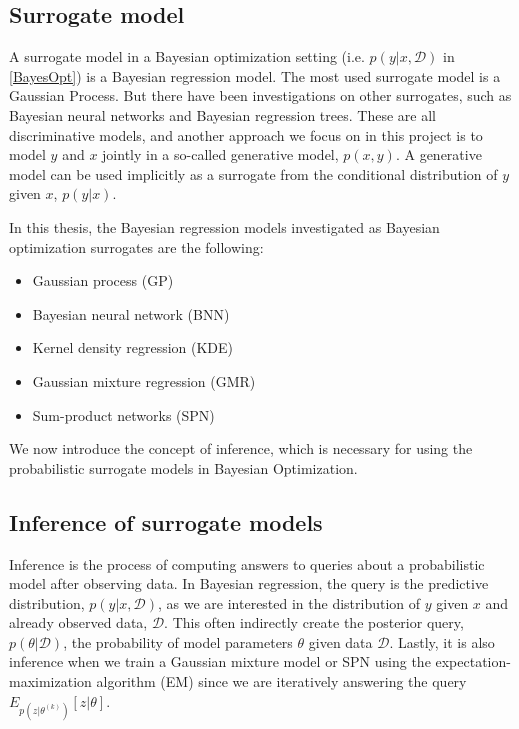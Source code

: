 \subsection{Surrogate model}
A surrogate model in a Bayesian optimization setting (i.e. $p(y|x,\mathcal{D})$ in \eqref{BayesOpt})
is a Bayesian regression model. The most used surrogate model is a Gaussian Process. But there have
been investigations on other surrogates, such as Bayesian neural networks and Bayesian regression
trees. These are all discriminative models, and another approach we focus on in this project is to
model $y$ and $x$ jointly in a so-called generative model, $p(x,y)$. A generative model can be used
implicitly as a surrogate from the conditional distribution of $y$ given $x$, $p(y|x)$.

In this thesis, the Bayesian regression models investigated as Bayesian optimization surrogates are
the following:
\begin{itemize}[noitemsep]
    \item Gaussian process (GP)
    \item Bayesian neural network (BNN)
    \item Kernel density regression (KDE)
    \item Gaussian mixture regression (GMR)
    \item Sum-product networks (SPN)
\end{itemize}

We now introduce the concept of inference, which is necessary for using the probabilistic surrogate models
in Bayesian Optimization. 

\subsection{Inference of surrogate models}
Inference is the process of computing answers to queries about a probabilistic model after observing
data. In Bayesian regression, the query is the predictive distribution, $p(y|x,\mathcal{D})$, as we
are interested in the distribution of $y$ given $x$ and already observed data, $\mathcal{D}$. This
often indirectly create the posterior query, $p(\theta|\mathcal{D})$, the probability of model
parameters $\theta$ given data $\mathcal{D}$. Lastly, it is also inference when we train a Gaussian
mixture model or SPN using the expectation-maximization algorithm (EM) since we are iteratively
answering the query $E_{p(z|\theta^{(k)})}[z|\theta]$.

